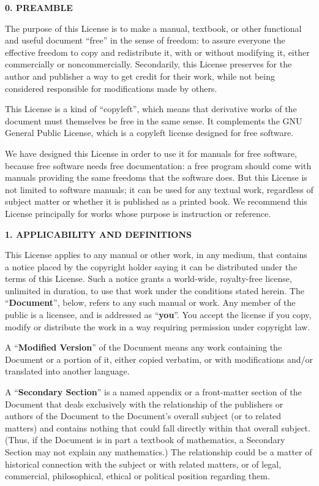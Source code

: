 \documentclass{scrbook}
\begin{document}
\begin{center}
{\Large\bfseries 0. PREAMBLE\par}
\end{center}
The purpose of this License is to make a manual, textbook, or other
functional and useful document ``free'' in the sense of freedom: to
assure everyone the effective freedom to copy and redistribute it,
with or without modifying it, either commercially or noncommercially.
Secondarily, this License preserves for the author and publisher a way
to get credit for their work, while not being considered responsible
for modifications made by others.

This License is a kind of ``copyleft'', which means that derivative
works of the document must themselves be free in the same sense.  It
complements the GNU General Public License, which is a copyleft
license designed for free software.

We have designed this License in order to use it for manuals for free
software, because free software needs free documentation: a free
program should come with manuals providing the same freedoms that the
software does.  But this License is not limited to software manuals;
it can be used for any textual work, regardless of subject matter or
whether it is published as a printed book.  We recommend this License
principally for works whose purpose is instruction or reference.


\begin{center}
{\Large\bfseries 1. APPLICABILITY AND DEFINITIONS\par}
\end{center}
This License applies to any manual or other work, in any medium, that
contains a notice placed by the copyright holder saying it can be
distributed under the terms of this License.  Such a notice grants a
world-wide, royalty-free license, unlimited in duration, to use that
work under the conditions stated herein.  The ``\textbf{Document}'', below,
refers to any such manual or work.  Any member of the public is a
licensee, and is addressed as ``\textbf{you}''.  You accept the license if you
copy, modify or distribute the work in a way requiring permission
under copyright law.

A ``\textbf{Modified Version}'' of the Document means any work containing the
Document or a portion of it, either copied verbatim, or with
modifications and/or translated into another language.

A ``\textbf{Secondary Section}'' is a named appendix or a front-matter section of
the Document that deals exclusively with the relationship of the
publishers or authors of the Document to the Document's overall subject
(or to related matters) and contains nothing that could fall directly
within that overall subject.  (Thus, if the Document is in part a
textbook of mathematics, a Secondary Section may not explain any
mathematics.)  The relationship could be a matter of historical
connection with the subject or with related matters, or of legal,
commercial, philosophical, ethical or political position regarding
them.
\end{document}
